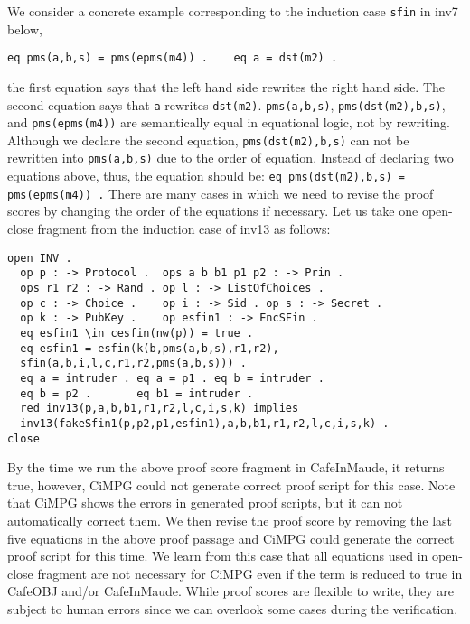 \documentclass[a4paper,fleqn]{cas-dc}
\begin{document}
We consider a concrete example corresponding to the induction case \verb!sfin! in inv7 below,
\begin{verbatim}
eq pms(a,b,s) = pms(epms(m4)) .    eq a = dst(m2) .
\end{verbatim}
\noindent
the first equation says that the left hand side rewrites the right hand side. The second equation says that \verb!a! rewrites \verb!dst(m2)!. 
\verb!pms(a,b,s)!, \verb!pms(dst(m2),b,s)!, and \verb!pms(epms(m4))! are semantically equal in equational logic, not by rewriting. 
Although we declare the second equation, \verb!pms(dst(m2),b,s)! can not be rewritten into \verb!pms(a,b,s)! due to the order of equation. Instead of declaring two equations above, thus, the equation should be: \verb!eq pms(dst(m2),b,s) = pms(epms(m4)) .! There are many cases in which we need to revise the proof scores by changing the order of the equations if necessary.
Let us take one open-close fragment from the induction case of inv13 as follows:
\begin{verbatim}
open INV .
  op p : -> Protocol .  ops a b b1 p1 p2 : -> Prin .
  ops r1 r2 : -> Rand . op l : -> ListOfChoices .
  op c : -> Choice .    op i : -> Sid . op s : -> Secret .    
  op k : -> PubKey .    op esfin1 : -> EncSFin .
  eq esfin1 \in cesfin(nw(p)) = true .
  eq esfin1 = esfin(k(b,pms(a,b,s),r1,r2),
  sfin(a,b,i,l,c,r1,r2,pms(a,b,s))) .
  eq a = intruder . eq a = p1 . eq b = intruder .
  eq b = p2 .       eq b1 = intruder . 
  red inv13(p,a,b,b1,r1,r2,l,c,i,s,k) implies
  inv13(fakeSfin1(p,p2,p1,esfin1),a,b,b1,r1,r2,l,c,i,s,k) .
close
\end{verbatim}
By the time we run the above proof score fragment in CafeInMaude, it returns true, however, CiMPG could not generate correct proof script for this case. Note that CiMPG shows the errors in generated proof scripts, but it can not automatically correct them. We then revise the proof score by removing the last five equations in the above proof passage and CiMPG could generate the correct proof script for this time. We learn from this case that all equations used in open-close fragment are not necessary for CiMPG even if the term is reduced to true in CafeOBJ and/or CafeInMaude. While proof scores are flexible to write, they are subject to human errors since we can overlook some cases during the verification. 
\end{document}
